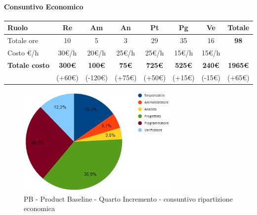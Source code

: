 \paragraph{Consuntivo Economico}
\begin{center}
	\renewcommand{\arraystretch}{1.8}
	\begin{tabular}{ |m{6em}|c|c|c|c|c|c|c| }
	\hline
	\textbf{Ruolo} & \textbf{Re} & \textbf{Am} &  \textbf{An} &  \textbf{Pt} &  \textbf{Pg} &  \textbf{Ve} &  \textbf{Totale}\\
    \hline
    Totale ore & 10 & 5 & 3 & 29 & 35 & 16 & \textbf{98}\\
    \hline
    Costo \euro/h & 30\euro/h & 20\euro/h & 25\euro/h & 25\euro/h & 15\euro/h & 15\euro/h & \\
    \hline
    \textbf{Totale costo} & \textbf{300\euro} & \textbf{100\euro} &  \textbf{75\euro} & \textbf{725\euro} &  \textbf{525\euro} &  \textbf{240\euro} &  \textbf{1965\euro} \\
    & (+60\euro) & (-120\euro) & (+75\euro) & (+50\euro) & (+15\euro) & (-15\euro) & (+65\euro) \\
    \hline
	\end{tabular}

    \begin{figure}[H]
        \centering\includegraphics[width=0.7\textwidth, height=0.7\textheight, keepaspectratio]{images/consuntivo/PB-incremento4-costo.png}
        \caption{PB - Product Baseline - Quarto Incremento - consuntivo ripartizione economica}
    \end{figure}
\end{center}

